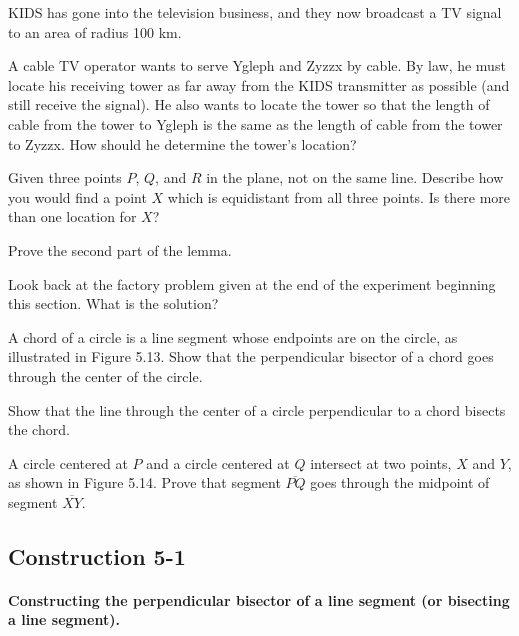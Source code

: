 \documentclass[12pt]{book} %
\begin{document}
\begin{ExerciseList}

\Exercise KIDS has gone into the television business, and they now broadcast a TV signal to an area of radius 100 km.


A cable TV operator wants to serve Ygleph and Zyzzx by cable. By law, he must locate his receiving tower as far away from the KIDS transmitter as possible (and still receive the signal). He also wants to locate the tower so that the length of cable from the tower to Ygleph is the same as the length of cable from the tower to Zyzzx. How should he determine the tower's location?

\Exercise Given three points $P$, $Q$, and $R$ in the plane, not on the same line. Describe how you would find a point $X$ which is equidistant from all three points. Is there more than one location for $X$?

\Exercise Prove the second part of the lemma.


\Exercise Look back at the factory problem given at the end of the experiment beginning this section. What is the solution?

\Exercise A chord of a circle is a line segment whose endpoints are on the circle, as illustrated in Figure 5.13. Show that the perpendicular bisector of a chord goes through the center of the circle.


\Exercise Show that the line through the center of a circle perpendicular to a chord bisects the chord.

\Exercise A circle centered at $P$ and a circle centered at $Q$ intersect at two points, $X$ and $Y$, as shown in Figure 5.14. Prove that segment $\overline{PQ}$ goes through the midpoint of segment $\overline{XY}$.

\end{ExerciseList}

\subsection*{Construction 5-1}

\paragraph{Constructing the perpendicular bisector of a line segment (or bisecting a line segment).}
\end{document}
